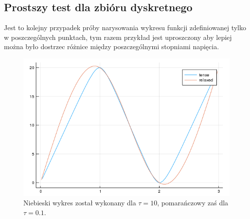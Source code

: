 \documentclass{article}
\begin{document}
\subsection{Prostszy test dla zbióru dyskretnego}
Jest to kolejny przypadek próby narysowania wykresu funkcji zdefiniowanej tylko w poszczególnych punktach, tym razem przykład jest uproszczony aby lepiej można było dostrzec różnice między poszczególnymi stopniami napięcia.
\begin{figure}[ht]
  \begin{center}
  \includegraphics[width=15cm]{zbiorDyskretny}
  \end{center}
  \caption{Niebieski wykres został wykonany dla $\tau = 10$, pomarańczowy zaś dla $\tau = 0.1$.}
  \label{fig:rysunek}
\end{figure}
\newpage
\end{document}
